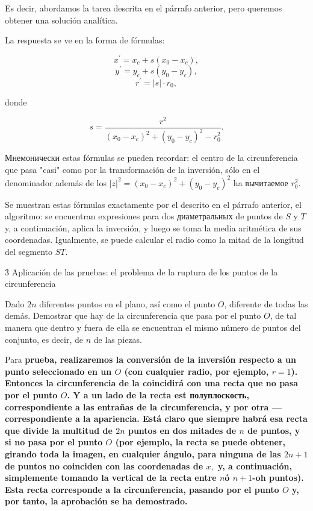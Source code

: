 Es decir, abordamos la tarea descrita en el párrafo anterior, pero queremos obtener una solución analítica.

La respuesta se ve en la forma de fórmulas:

$$ x^\prime = x_c + s (x_0 - x_c), $$
$$ y^\prime = y_c + s (y_0 - y_c), $$
$$ r^\prime = |s| \cdot r_0, $$

donde

$$ s = \frac{ r^2 }{ (x_0 - x_c)^2 + (y_0 - y_c)^2 - r_0^2 }. $$

Мнемонически estas fórmulas se pueden recordar: el centro de la circunferencia que pasa "casi" como por la transformación de la inversión, sólo en el denominador además de los $|z|^2 = (x_0 - x_c)^2 + (y_0 - y_c)^2$ ha вычитаемое $r_0^2$.

Se muestran estas fórmulas exactamente por el descrito en el párrafo anterior, el algoritmo: se encuentran expresiones para dos диаметральных de puntos de $S$ y $T$ y, a continuación, aplica la inversión, y luego se toma la media aritmética de sus coordenadas. Igualmente, se puede calcular el radio como la mitad de la longitud del segmento $ST$.


\h3{ Aplicación de las pruebas: el problema de la ruptura de los puntos de la circunferencia }

Dado $2n$ diferentes puntos en el plano, así como el punto $O$, diferente de todas las demás. Demostrar que hay de la circunferencia que pasa por el punto $O$, de tal manera que dentro y fuera de ella se encuentran el mismo número de puntos del conjunto, es decir, de $n$ de las piezas.

Para \bf{prueba}, realizaremos la conversión de la inversión respecto a un punto seleccionado en un $O$ (con cualquier radio, por ejemplo, $r=1$). Entonces la circunferencia de la coincidirá con una recta que no pasa por el punto $O$. Y a un lado de la recta est полуплоскость, correspondiente a las entrañas de la circunferencia, y por otra --- correspondiente a la apariencia. Está claro que siempre habrá esa recta que divide la multitud de $2n$ puntos en dos mitades de $n$ de puntos, y si no pasa por el punto $O$ (por ejemplo, la recta se puede obtener, girando toda la imagen, en cualquier ángulo, para ninguna de las $2n+1$ de puntos no coinciden con las coordenadas de $x,$ y, a continuación, simplemente tomando la vertical de la recta entre $n$ó $n+1$-oh puntos). Esta recta corresponde a la circunferencia, pasando por el punto $O$ y, por tanto, la aprobación se ha demostrado.


